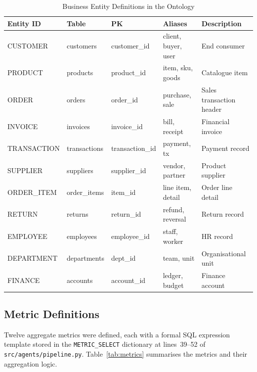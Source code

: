 \documentclass[12pt,a4paper]{report}
\begin{document}
\begin{table}[H]
  \centering
  \caption{Business Entity Definitions in the Ontology}
  \label{tab:entities}
  \renewcommand{\arraystretch}{1.2}
  \begin{tabularx}{\textwidth}{@{}llllX@{}}
    \toprule
    \textbf{Entity ID} & \textbf{Table} & \textbf{PK} & \textbf{Aliases} & \textbf{Description} \\
    \midrule
    CUSTOMER    & customers    & customer\_id & client, buyer, user & End consumer \\
    PRODUCT     & products     & product\_id  & item, sku, goods  & Catalogue item \\
    ORDER       & orders       & order\_id    & purchase, sale    & Sales transaction header \\
    INVOICE     & invoices     & invoice\_id  & bill, receipt     & Financial invoice \\
    TRANSACTION & transactions & transaction\_id & payment, tx    & Payment record \\
    SUPPLIER    & suppliers    & supplier\_id & vendor, partner   & Product supplier \\
    ORDER\_ITEM & order\_items & item\_id     & line item, detail & Order line detail \\
    RETURN      & returns      & return\_id   & refund, reversal  & Return record \\
    EMPLOYEE    & employees    & employee\_id & staff, worker     & HR record \\
    DEPARTMENT  & departments  & dept\_id     & team, unit        & Organisational unit \\
    FINANCE     & accounts     & account\_id  & ledger, budget    & Finance account \\
    \bottomrule
  \end{tabularx}
\end{table}

\subsection{Metric Definitions}
\label{subsec:metrics}

Twelve aggregate metrics were defined, each with a formal \ac{SQL} expression template stored in the \texttt{METRIC\_SELECT} dictionary at lines~39--52 of \texttt{src/agents/pipeline.py}. Table~\ref{tab:metrics} summarises the metrics and their aggregation logic.
\end{document}
